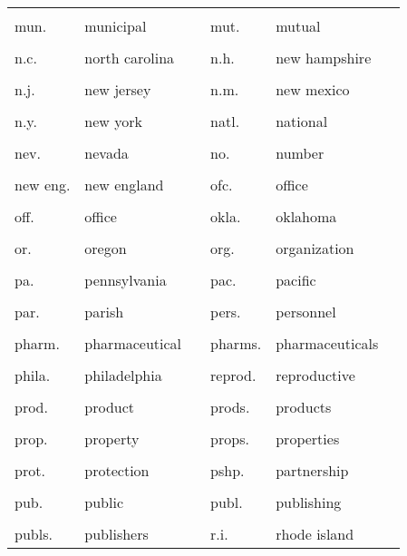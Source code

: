 \documentclass[10pt, letterpaper]{article}
\begin{document}
\begin{spacing}{1.0}
\begin{footnotesize}
\begin{longtable}[H]{p{1in}>{\raggedright}p{2in} p{0.2in} p{1in}>{\raggedright}p{2in} p{0in}}
    &  &  &  &  & \\[-6pt]
    mun. & municipal & & mut. & mutual &\\
    &  &  &  &  & \\[-6pt]
    n.c. & north carolina & & n.h. & new hampshire &\\
    &  &  &  &  & \\[-6pt]
    n.j. & new jersey & & n.m. & new mexico &\\
    &  &  &  &  & \\[-6pt]
    n.y. & new york & & natl. & national &\\
    &  &  &  &  & \\[-6pt]
    nev. & nevada & & no. & number &\\
    &  &  &  &  & \\[-6pt]
    new eng. & new england & & ofc. & office &\\
    &  &  &  &  & \\[-6pt]
    off. & office & & okla. & oklahoma &\\
    &  &  &  &  & \\[-6pt]
    or. & oregon & & org. & organization &\\
    &  &  &  &  & \\[-6pt]
    pa. & pennsylvania & & pac. & pacific &\\
    &  &  &  &  & \\[-6pt]
    par. & parish & & pers. & personnel &\\
    &  &  &  &  & \\[-6pt]
    pharm. & pharmaceutical & & pharms. & pharmaceuticals &\\
    &  &  &  &  & \\[-6pt]
    phila. & philadelphia & & reprod. & reproductive &\\
    &  &  &  &  & \\[-6pt]
    prod. & product & & prods. & products &\\
    &  &  &  &  & \\[-6pt]
    prop. & property & & props. & properties &\\
    &  &  &  &  & \\[-6pt]
    prot. & protection & & pshp. & partnership &\\
    &  &  &  &  & \\[-6pt]
    pub. & public & & publ. & publishing &\\
    &  &  &  &  & \\[-6pt]
    publs. & publishers & & r.i. & rhode island &\\

\end{longtable}
\end{footnotesize}
\end{spacing}
\end{document}
